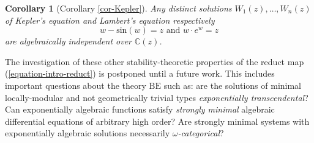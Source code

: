 \documentclass[12pt]{amsart}
\newcommand{\BE}{\mathrm{BE}}
\theoremstyle{definition}
\theoremstyle{plain}
\theoremstyle{exampstyle}\newtheorem{thmx}{Theorem}
\theoremstyle{exampstyle}\newtheorem{thmxbis}{Theorem}
\newtheorem*{corx}{Corollary}
\begin{document}
 \begin{corx}[Corollary \ref{cor-Kepler}]
Any distinct solutions $W_1(z),\ldots, W_n(z)$ of Kepler's equation and Lambert's equation respectively
\begin{equation*}
w - \mathrm{sin}(w) = z \text{ and } w \cdot e^w = z
\end{equation*} are algebraically independent over $\mathbb{C}(z)$. 
\end{corx} 
The investigation of these other stability-theoretic properties  of the reduct map (\ref{equation-intro-reduct}) is postponed until a future work. This includes important questions about the theory $\BE$ such as: are the solutions of minimal locally-modular and not geometrically trivial types {\em exponentially transcendental}? Can exponentially algebraic functions satisfy {\em strongly minimal} algebraic differential equations of arbitrary high order? Are strongly minimal systems with exponentially algebraic solutions necessarily {\em $\omega$-categorical}?
%
%
%
%
%
\end{document}
